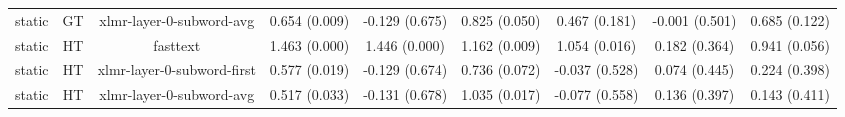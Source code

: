 \begin{sidewaystable}[htb]
\begin{tabular}{@{}ccccccccc@{}}
        static & GT & xlmr-layer-0-subword-avg & 0.654 (0.009) & -0.129 (0.675) & 0.825 (0.050) & 0.467 (0.181) & -0.001 (0.501) & 0.685 (0.122) \\
        static & HT & fasttext & 1.463 (0.000) & 1.446 (0.000) & 1.162 (0.009) & 1.054 (0.016) & 0.182 (0.364) & 0.941 (0.056) \\
        static & HT & xlmr-layer-0-subword-first & 0.577 (0.019) & -0.129 (0.674) & 0.736 (0.072) & -0.037 (0.528) & 0.074 (0.445) & 0.224 (0.398) \\
        static & HT & xlmr-layer-0-subword-avg & 0.517 (0.033) & -0.131 (0.678) & 1.035 (0.017) & -0.077 (0.558) & 0.136 (0.397) & 0.143 (0.411) \\
        \bottomrule
    \end{tabular}
\end{sidewaystable}
